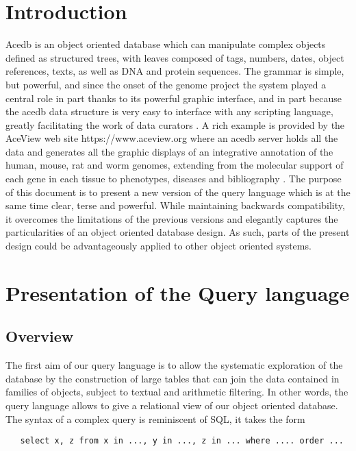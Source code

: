 \documentclass[11pt]{article}
\newcommand{\BL}{\begin{lstlisting}}
\begin{document}
\newpage
\tableofcontents
\newpage

%%%%%%%%%%%%%%%%%%%%%%%%%%%%%%%%%%%%%%%%%%%%%%%%%%%%%%%%%%%%%%%%
% SECTION
%%%%%%%%%%%%%%%%%%%%%%%%%%%%%%%%%%%%%%%%%%%%%%%%%%%%%%%%%%%%%%%%
\section{Introduction}
Acedb \cite{DTM94} is an object oriented database which can manipulate complex objects defined as structured trees, 
with leaves composed of tags, numbers, dates, object references, texts, as well as DNA and protein sequences. 
The grammar is simple, but powerful, and since the onset of the genome project the system played a central role in part thanks to
its powerful graphic interface, and in part because the acedb data structure is very easy to interface
with any scripting language, greatly facilitating the work of data curators \cite{DTM92}. A rich example is provided by the  AceView 
web site https://www.aceview.org where an acedb server holds all the data
and generates all the graphic displays of an integrative annotation of the human, mouse, rat and worm genomes,
extending from the molecular support of each gene in each tissue to phenotypes, diseases and bibliography \cite{cDNA} . 
The purpose of this document is to present a new version of the query language
which is at the same time clear, terse and powerful. While maintaining backwards
compatibility, it overcomes the limitations of the previous versions and elegantly
captures the particularities of an object oriented database design. As such, parts of the present
design could be advantageously applied to other object oriented systems.
\label{sec1}


%%%%%%%%%%%%%%%%%%%%%%%%%%%%%%%%%%%%%%%%%%%%%%%%%%%%%%%%%%%%%%%%
% SECTION
%%%%%%%%%%%%%%%%%%%%%%%%%%%%%%%%%%%%%%%%%%%%%%%%%%%%%%%%%%%%%%%%
\section{Presentation of the Query language}
\subsection{Overview}

The first aim of our query language is to allow the systematic exploration of the database
by the construction of large tables that can join the data contained in families of objects,
subject to textual and arithmetic filtering. In other words, the query language
allows to give a relational view of our object oriented database. 
The syntax of a complex query is reminiscent of SQL, it takes the form
\BL
   select x, z from x in ..., y in ..., z in ... where .... order ...
\end{lstlisting}
\end{document}
